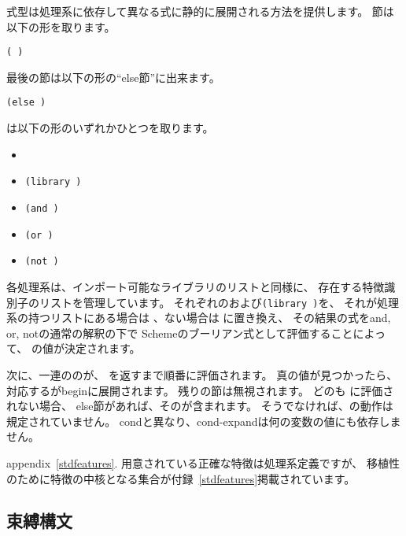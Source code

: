 \begin{entry}{%
}

\syntax
{}式型は処理系に依存して異なる式に静的に展開される方法を提供します。
節は以下の形を取ります。

{\tt(  \dotsfoo)}

最後の節は以下の形の``else節''に出来ます。

{\tt(else  \dotsfoo)}

は以下の形のいずれかひとつを取ります。

\begin{itemize}
\item {\tt{}}
\item {\tt(library )}
\item {\tt(and  \dotsfoo)}
\item {\tt(or  \dotsfoo)}
\item {\tt(not )}
\end{itemize}

\semantics
各処理系は、インポート可能なライブラリのリストと同様に、
存在する特徴識別子のリストを管理しています。
それぞれのおよび{\tt(library )}を、
それが処理系の持つリストにある場合は \schtrue、ない場合は \schfalse に置き換え、
その結果の式を{\cf and}, {\cf or}, {\cf not}の通常の解釈の下で
Schemeのブーリアン式として評価することによって、
の値が決定されます。

次に、一連ののが、
\schtrue を返すまで順番に評価されます。
真の値が見つかったら、対応するが{\cf begin}に展開されます。
残りの節は無視されます。
どのも \schtrue に評価されない場合、
else節があれば、そのが含まれます。
そうでなければ、の動作は規定されていません。
{\cf cond}と異なり、{\cf cond-expand}は何の変数の値にも依存しません。

appendix~\ref{stdfeatures}.
用意されている正確な特徴は処理系定義ですが、
移植性のために特徴の中核となる集合が付録~\ref{stdfeatures}掲載されています。

\end{entry}

\subsection{束縛構文}
\label{bindingsection}

